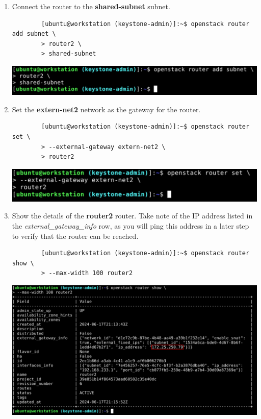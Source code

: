 \documentclass[letterpaper, 12pt]{article}
\begin{document}
\begin{enumerate}
    \item Connect the router to the \textbf{shared-subnet} subnet.
    \begin{lstlisting}
        [ubuntu@workstation (keystone-admin)]:~$ openstack router add subnet \
        > router2 \
        > shared-subnet
    \end{lstlisting}

    \begin{center}
        \includegraphics[width=\linewidth]{images/part2/step13.png}
    \end{center}

    \item Set the \textbf{extern-net2} network as the gateway for the router.
    \begin{lstlisting}
        [ubuntu@workstation (keystone-admin)]:~$ openstack router set \
        > --external-gateway extern-net2 \
        > router2
    \end{lstlisting}

    \begin{center}
        \includegraphics[width=\linewidth]{images/part2/step14.png}
    \end{center}

    \item Show the details of the \textbf{router2} router.
    Take note of the IP address listed in the \textit{external\_gateway\_info} row, as you will ping this address in a later step to verify that the router can be reached.
    \begin{lstlisting}
        [ubuntu@workstation (keystone-admin)]:~$ openstack router show \
        > --max-width 100 router2
    \end{lstlisting}

    \begin{center}
        \includegraphics[width=\linewidth]{images/part2/step15.png}
    \end{center}


\end{enumerate}
\end{document}
